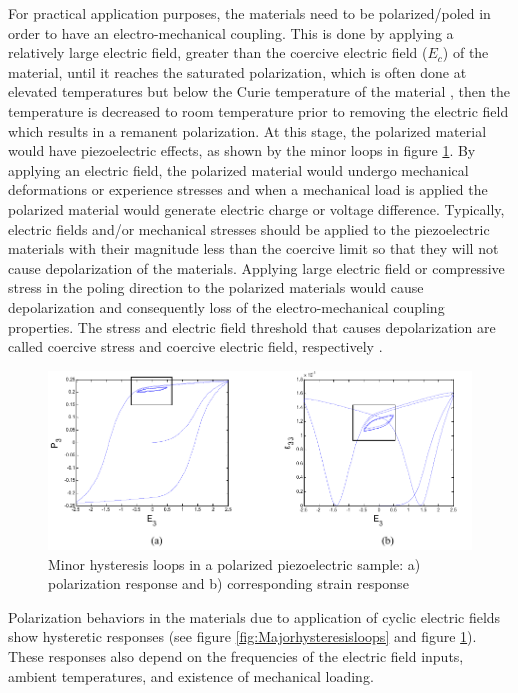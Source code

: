 For practical application purposes, the materials need to be polarized/poled in order to have an electro-mechanical coupling. 
This is done by applying a relatively large electric field, greater than the coercive electric field ($E_c$) of the material,
 until it reaches the saturated polarization,
  which is often done at elevated temperatures but below the Curie temperature of the material \cite{Lines1977},
   then the temperature is decreased to room temperature prior to removing the electric field which results in a remanent polarization. 
At this stage, the polarized material would have piezoelectric effects, as shown by the minor loops in figure \ref{fig:Manorhysteresisloops}. 
By applying an electric field, the polarized material would undergo mechanical deformations or experience stresses and when a mechanical load is applied the polarized material would generate electric charge or voltage difference. 
Typically, electric fields and/or mechanical stresses should be applied to the piezoelectric materials with their magnitude less than the coercive limit so that they will not cause depolarization of the materials. 
Applying large electric field or compressive stress in the poling direction to the polarized materials would cause depolarization and  consequently loss of the electro-mechanical coupling properties. 
The stress and electric field threshold that causes depolarization are called coercive stress and coercive electric field, respectively \cite{Sohrabi201344}.

\begin{figure}
\centering
\includegraphics[width=6in]{./chap_2_pol_sw/figures/minorloop_polarization_switching.pdf}
\caption{Minor hysteresis loops in a polarized piezoelectric sample: a) polarization response and b) corresponding strain response}
\label{fig:Manorhysteresisloops}
\end{figure} 

Polarization behaviors in the materials due to application of cyclic electric fields show hysteretic responses (see figure \ref{fig:Majorhysteresisloops} and figure \ref{fig:Manorhysteresisloops}). 
These responses also depend on the frequencies of the electric field inputs, ambient temperatures, and existence of mechanical loading. 

